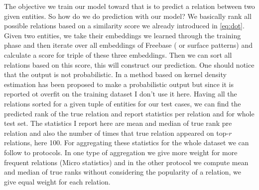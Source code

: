The objective we train our model toward that is to predict a relation between
two given entities. So how do we do prediction with our model? We basically rank
all possible relations based on a similarity score we already introduced in
\eqref{eq:dot}. Given two entities, we take their embeddings we learned through
the training phase and then iterate over all embeddings of Freebase ( or
surface patterns) and calculate a score for triple of these three embeddings.
Then we can sort all relations based on this score, this will construct our
prediction. One should notice that the output is not probabilistic. In
\cite{Bordes2011} a method based on kernel density estimation has been proposed
to make a probabilistic output but since it is reported ot overfit on the
training dataset I don't use it here. 
Having all the relations sorted for a given tuple of entities for our test
cases, we can find the predicted rank of the true relation and report statistics
per relation and for whole test set. The statistics I report here are mean and
median of true rank pre relation and also the number of times that true relation
appeared on top-$r$ relations, here 100. For aggregating these statistics for
the whole dataset we can follow to protocols. In one type of aggregation we
give more weight for more frequent relations (Micro statistics) and in the other
protocol we compute mean and median of true ranks without considering the
popularity of a relation, we give equal weight for each relation. 

